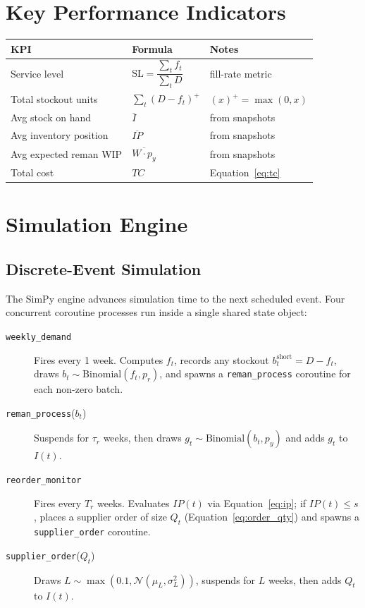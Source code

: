 \documentclass[11pt]{article}
\begin{document}
\section{Key Performance Indicators}

\begin{center}
\begin{tabular}{lll}
\toprule
KPI & Formula & Notes \\
\midrule
Service level & $\mathrm{SL} = \dfrac{\sum_t f_t}{\sum_t D}$ & fill-rate metric \\[6pt]
Total stockout units & $\sum_t (D - f_t)^+$ & $(x)^+ = \max(0,x)$ \\[4pt]
Avg stock on hand & $\bar{I}$ & from snapshots \\[4pt]
Avg inventory position & $\overline{IP}$ & from snapshots \\[4pt]
Avg expected reman WIP & $\overline{W \cdot p_y}$ & from snapshots \\[4pt]
Total cost & $TC$ & Equation~\eqref{eq:tc} \\
\bottomrule
\end{tabular}
\end{center}

\section{Simulation Engine}

\subsection{Discrete-Event Simulation}

The SimPy engine advances simulation time to the next scheduled event.  Four
concurrent coroutine processes run inside a single shared state object:

\begin{description}
  \item[\texttt{weekly\_demand}] Fires every 1 week.  Computes $f_t$, records
    any stockout $b_t^{\mathrm{short}} = D - f_t$, draws
    $b_t \sim \mathrm{Binomial}(f_t, p_r)$, and spawns a
    \texttt{reman\_process} coroutine for each non-zero batch.

  \item[\texttt{reman\_process}($b_t$)] Suspends for $\tau_r$ weeks, then draws
    $g_t \sim \mathrm{Binomial}(b_t, p_y)$ and adds $g_t$ to $I(t)$.

  \item[\texttt{reorder\_monitor}] Fires every $T_r$ weeks.  Evaluates
    $IP(t)$ via Equation~\eqref{eq:ip}; if $IP(t) \le s$, places a supplier
    order of size $Q_t$ (Equation~\eqref{eq:order_qty}) and spawns a
    \texttt{supplier\_order} coroutine.

  \item[\texttt{supplier\_order}($Q_t$)] Draws $L \sim \max(0.1,
    \mathcal{N}(\mu_L, \sigma_L^2))$, suspends for $L$ weeks, then adds $Q_t$
    to $I(t)$.
\end{description}
\end{document}

